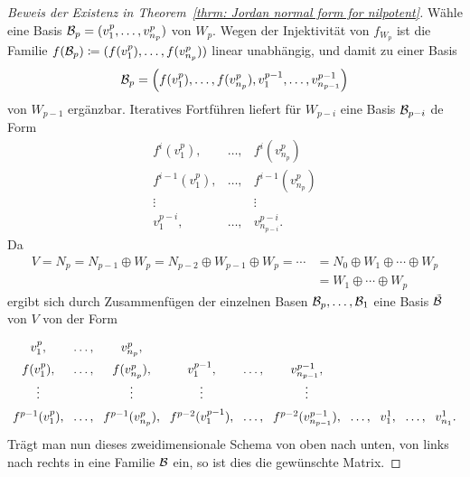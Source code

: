 \begin{proof}[Beweis der Existenz in Theorem~\ref{thrm: Jordan normal form for nilpotent}]
  Wähle eine Basis $\mathcal{B}_p = (v^p_1, \dotsc, v^p_{n_p})$ von $W_p$.
  Wegen der Injektivität von $f_{W_p}$ ist die Familie $f(\mathcal{B}_p) \coloneqq (f(v^p_1), \dotsc, f(v^p_{n_p}))$ linear unabhängig, und damit zu einer Basis
  \[
    \mathcal{B}_p = \left( f(v^p_1), \dotsc, f(v^p_{n_p}), v^{p-1}_1, \dotsc, v^{p-1}_{n_{p-1}} \right)
  \]
  von $W_{p-1}$ ergänzbar.
  Iteratives Fortführen liefert für $W_{p-i}$ eine Basis $\mathcal{B}_{p-i}$ de Form
  \[
    \renewcommand{\arraystretch}{1.5}
    \begin{matrix}
      f^i(v^p_1),     & \dotsc,  & f^i(v^p_{n_p})      \\
      f^{i-1}(v^p_1), & \dotsc,  & f^{i-1}(v^p_{n_p})  \\
      \vdots          &          & \vdots              \\
      v^{p-i}_1,      & \dotsc,  & v^{p-i}_{n_{p-i}}.
    \end{matrix}
  \]
  Da
  \begin{align*}
       V
     = N_p
     = N_{p-1} \oplus W_p
     = N_{p-2} \oplus W_{p-1} \oplus W_p
     = \dotsb
    &= N_0 \oplus W_1 \oplus \dotsb \oplus W_p \\
    &= W_1 \oplus \dotsb \oplus W_p
  \end{align*}
  ergibt sich durch Zusammenfügen der einzelnen Basen $\mathcal{B}_p, \dotsc, \mathcal{B}_1$ eine Basis $\tilde{\mathcal{B}}$ von $V$ von der Form
  \[
    \renewcommand{\arraystretch}{1.5}
    \setlength\arraycolsep{4pt}
    \begin{array}{cccccccccc}
      v^p_1,          & \dotsc, & v^p_{n_p},          &                     &         &                             &         &         &         &             \\
      f(v^p_1),       & \dotsc, & f(v^p_{n_p}),       & v^{p-1}_1,          & \dotsc, & v^{p-1}_{n_{p-1}},          &         &         &         &             \\
      \vdots          &         & \vdots              & \vdots              &         & \vdots                      &         &         &         &             \\
      f^{p-1}(v^p_1), & \dotsc, & f^{p-1}(v^p_{n_p}), & f^{p-2}(v^{p-1}_1), & \dotsc, & f^{p-2}(v^{p-1}_{n_{p-1}}), & \dotsc, & v^1_1,  & \dotsc, & v^1_{n_1}.
    \end{array}
  \]
  Trägt man nun dieses zweidimensionale Schema von oben nach unten, von links nach rechts in eine Familie $\mathcal{B}$ ein, so ist dies die gewünschte Matrix.
\end{proof}


